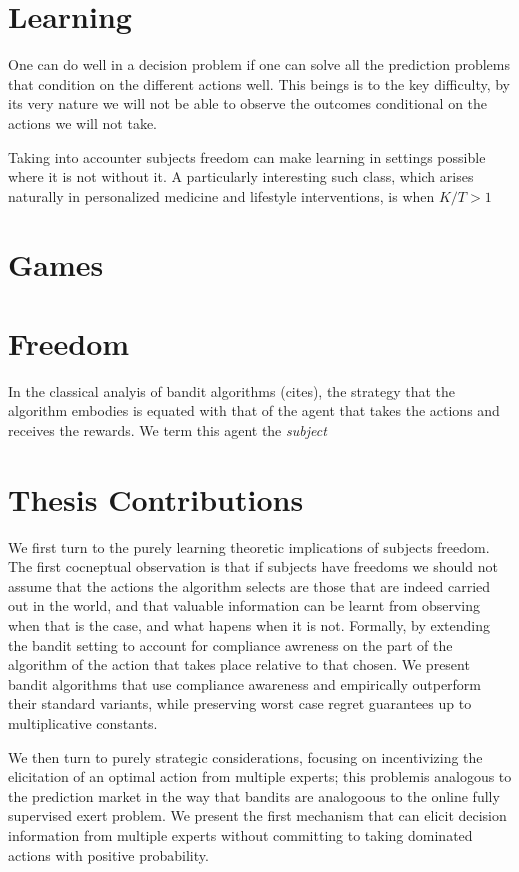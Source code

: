 \section{Learning}


One can do well in a decision problem if one can solve all the prediction problems that condition on the different actions well.
This beings is to the key difficulty, by its very nature we will not be able to observe the outcomes conditional on the actions we will not take. 

Taking into accounter subjects freedom can make learning in settings possible where it is not without it.
A particularly interesting such class, which arises naturally in personalized medicine and lifestyle interventions, is when $K/T > 1$


\section{Games}




\section{Freedom}

In the classical analyis of bandit algorithms (cites), the strategy that the algorithm embodies is equated with that of the agent that takes the actions and receives the rewards.
We term this agent the \emph{subject}



\section{Thesis Contributions}

We first turn to the purely learning theoretic implications of subjects freedom. The first cocneptual observation is that if subjects have freedoms we should not assume that the actions the algorithm selects are those that are indeed carried out in the world, and that valuable information can be learnt from observing when that is the case, and what hapens when it is not.
Formally, by extending the bandit setting to account for compliance awreness on the part of the algorithm of the action that takes place relative to that chosen. We present bandit algorithms that use compliance awareness and empirically  outperform their standard variants, while preserving worst case regret guarantees up to multiplicative constants. 

We then turn to purely strategic considerations, focusing on incentivizing the elicitation of an optimal action from multiple experts; this problemis analogous to the prediction market in the way that bandits are analogoous to the online fully supervised exert problem. 
We present the first mechanism that can elicit decision  information from multiple experts without committing to taking dominated actions with positive probability. 

